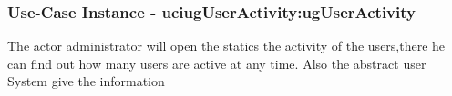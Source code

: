 
	\subsubsection{Use-Case Instance - uciugUserActivity:ugUserActivity}
	
	The actor administrator will open the statics the activity of the users,there he can find out how many users are active at any time. Also the abstract user System give the information		  
	\begin{operationmodel}
	
	\end{operationmodel} 

	
